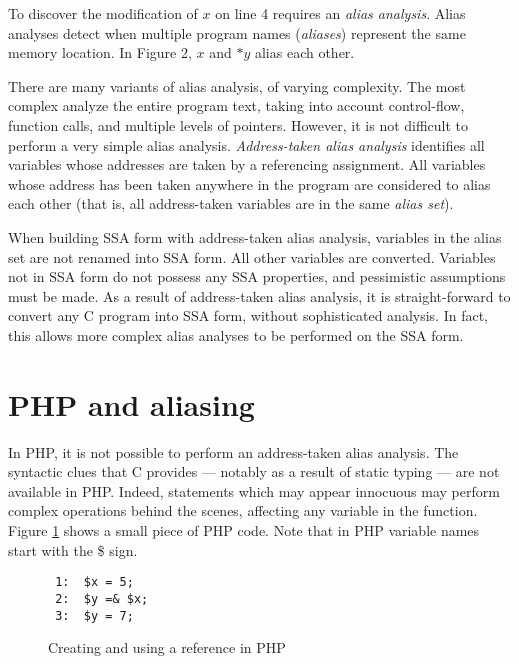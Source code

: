 To discover the modification of $x$ on line 4 requires an
\textit{alias analysis}.  Alias analyses detect when multiple program
names (\textit{aliases}) represent the same memory location.  In
Figure 2, $x$ and $*y$ alias each other.

There are many variants of alias analysis, of varying complexity.  The
most complex analyze the entire program text, taking into account
control-flow, function calls, and multiple levels of pointers.
However, it is not difficult to perform a very simple alias analysis.
\textit{Address-taken alias analysis} identifies all variables whose
addresses are taken by a referencing assignment.  All variables whose
address has been taken anywhere in the program are considered to alias
each other (that is, all address-taken variables are in the same
\textit{alias set}).

When building SSA form with address-taken alias analysis, variables in
the alias set are not renamed into SSA form.  All other variables are
converted.  Variables not in SSA form do not possess any SSA
properties, and pessimistic assumptions must be made.  As a result of
address-taken alias analysis, it is straight-forward to convert any C
program into SSA form, without sophisticated analysis.  In fact, this
allows more complex alias analyses to be performed on the SSA form.

\section{PHP and aliasing}


In PHP, it is not possible to perform an address-taken alias analysis.
The syntactic clues that C provides --- notably as a result of static
typing --- are not available in PHP.  Indeed, statements which may
appear innocuous may perform complex operations behind the scenes,
affecting any variable in the function. Figure \ref{php-reference}
shows a small piece of PHP code. Note that in PHP variable names
start with the \$ sign.

\begin{figure}[thp]
\begin{verbatim}
 1:  $x = 5;
 2:  $y =& $x;
 3:  $y = 7;
\end{verbatim}
\caption{Creating and using a reference in PHP}
\label{php-reference}
\end{figure}


